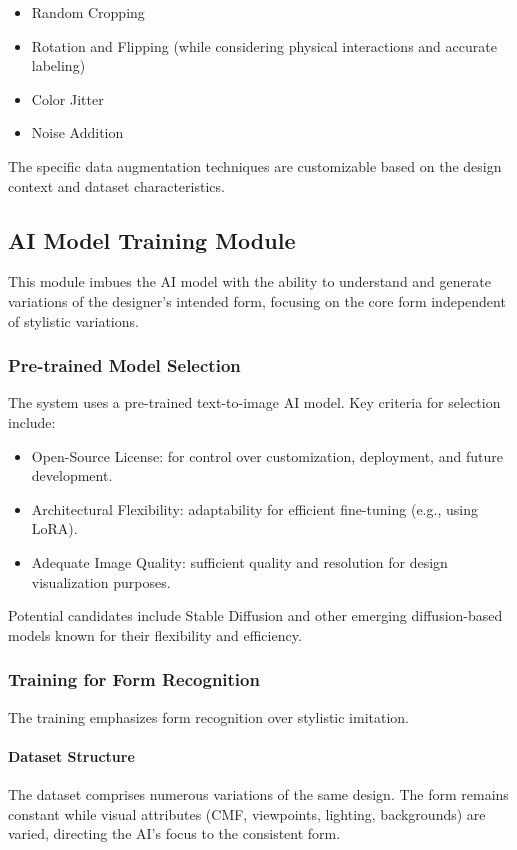 \documentclass[12pt]{article}
\begin{document}
\begin{itemize}
    \item Random Cropping
    \item Rotation and Flipping (while considering physical interactions and accurate labeling)
    \item Color Jitter
    \item Noise Addition 
\end{itemize}

The specific data augmentation techniques are customizable based on the design context and dataset characteristics.

\subsection{AI Model Training Module}
This module imbues the AI model with the ability to understand and generate variations of the designer's intended form, focusing on the core form independent of stylistic variations.

\subsubsection{Pre-trained Model Selection}
The system uses a pre-trained text-to-image AI model. Key criteria for selection include:
\begin{itemize}
    \item Open-Source License: for control over customization, deployment, and future development.
    \item Architectural Flexibility: adaptability for efficient fine-tuning (e.g., using LoRA).
    \item Adequate Image Quality: sufficient quality and resolution for design visualization purposes.
\end{itemize}
Potential candidates include Stable Diffusion and other emerging diffusion-based models known for their flexibility and efficiency.

\subsubsection{Training for Form Recognition}

The training emphasizes form recognition over stylistic imitation.

\paragraph{Dataset Structure}
The dataset comprises numerous variations of the same design. The form remains constant while visual attributes (CMF, viewpoints, lighting, backgrounds) are varied, directing the AI's focus to the consistent form.
\end{document}
